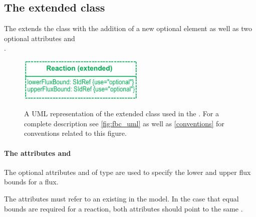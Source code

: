 

\subsection{The extended  class}
\label{reaction-class-ga}

The \FBCPackage extends the \sbmlthreecore \Reaction class with the addition of
a new optional element \GeneProteinAssociation as well as two optional attributes
 and \\
.

\begin{figure}[h]
  \centering
  \includegraphics[width=6cm]{images/v2harmony_fbc_reaction.pdf}\\
  \caption{A UML representation of the extended \SBML \Reaction class used in
  the \FBCPackage. For a complete description see \ref{fig:fbc_uml} as well as \ref{conventions} for conventions related to this figure.}
  \label{fig:fbc_uml_reaction}
\end{figure}

\paragraph{The attributes  and }
The optional attributes  and  of type  are used to specify the lower and upper flux bounds for a \Reaction flux.

The attributes must refer to an existing \Parameter in the model. In the case that equal bounds are required for a reaction, both attributes should point to the same \Parameter.

